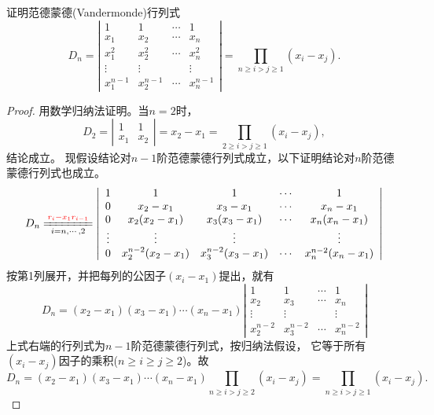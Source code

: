 \documentclass[10pt,a4paper%
tablecaptionabove]{article}
\newcommand{\red}{\textcolor{red}}
\newcommand{\cd}{\cdots}
\newcommand{\vd}{\vdots}
\begin{document}
\begin{CJK}{UTF8}{gkai}
\begin{li}
  证明范德蒙德(Vandermonde)行列式
  $$
  D_n = \left|
    \begin{array}{cccc}
      1        &  1        & \cd &    1     \\                    
      x_1      &  x_2      & \cd &    x_n    \\ 
      x_1^2    &  x_2^2     & \cd &   x_n^2   \\ 
      \vd      &  \vd      &     &    \vd      \\
      x_1^{n-1} & x_2^{n-1} &  \cd &  x_n^{n-1}
    \end{array}
  \right|
  = \prod_{n \ge i > j \ge 1}(x_i-x_j).
  $$
\end{li}
\begin{proof}
  用数学归纳法证明。当$n=2$时，
  $$
  D_2 = \left|
    \begin{array}{cc}
      1 & 1 \\
      x_1 & x_2
    \end{array}
  \right|
  = x_2 - x_1 = \prod_{2 \ge i > j \ge 1} (x_i - x_j),
  $$
  结论成立。
  现假设结论对$n-1$阶范德蒙德行列式成立，以下证明结论对$n$阶范德蒙德行列式也成立。 
  $$
  D_n \xlongequal[i=n,\cdots, 2]{\red{r_i - x_1 r_{i-1}}}\left|
    \begin{array}{ccccc}  
      1     & 1                    & 1                       & \cd   & 1    \\
      0     & x_2 - x_1            & x_3 - x_1               &  \cd  & x_n - x_1 \\
      0     & x_2(x_2 - x_1)       & x_3(x_3 - x_1)          &  \cd  & x_n(x_n - x_1)\\
      \vd   & \vd                  & \vd                     &      & \vd   \\
      0     & x_2^{n-2}(x_2-x_1)    & x_3^{n-2}(x_3 - x_1)    &  \cd  & x_n^{n-2}(x_n - x_1) 
    \end{array}\right|
  $$  
  按第1列展开，并把每列的公因子$(x_i-x_1)$提出，就有
  $$
  D_n = (x_2-x_1)(x_3-x_1)\cdots(x_n-x_1)\left|
    \begin{array}{cccc}  
      1            & 1          &  \cd  & 1 \\
      x_2          & x_3         &  \cd  & x_n\\
      \vd          & \vd         &      & \vd   \\
      x_2^{n-2}     & x_3^{n-2}    &  \cd  & x_n^{n-2}
    \end{array}\right|
  $$
  上式右端的行列式为$n-1$阶范德蒙德行列式，按归纳法假设，
  它等于所有$(x_i-x_j)$因子的乘积($n\ge i \ge j \ge 2$)。故
  $$
  D_n = (x_2-x_1)(x_3-x_1)\cdots(x_n-x_1) \prod_{n\ge i > j \ge 2}(x_i - x_j)
  = \prod_{n\ge i > j \ge 1}(x_i - x_j).
  $$
\end{proof}


\end{CJK}
\end{document}
